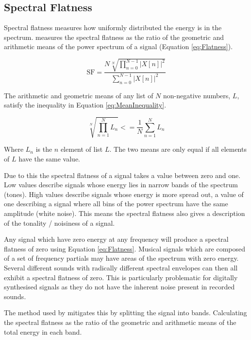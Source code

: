 	\subsection{Spectral Flatness}
	\label{sec:FetureControl-Parameterisation-Flatness}
		Spectral flatness measures how uniformly distributed the energy is in the spectrum.
		\citet{johnston1988transform} measures the spectral flatness as the ratio of the geometric and arithmetic
		means of the power spectrum of a signal (Equation \ref{eq:Flatness}).

		\begin{equation}
			\textrm{SF} = \frac{N\sqrt[N]{\prod_{n = 0}^{N - 1} |X[n]|^{2}}}
			                   {\sum_{n = 0}^{N - 1} |X[n]|^{2}}
			\label{eq:Flatness}
		\end{equation}

		The arithmetic and geometric means of any list of $N$ non-negative numbers, $L$, satisfy the inequality in
		Equation \ref{eq:MeanInequality}.

		\begin{equation}
			\sqrt[N]{\prod_{n = 1}^{N} L_{n}} <= \frac{1}{N} \sum_{n = 1}^{N} L_{n}
			\label{eq:MeanInequality}
		\end{equation}

		Where $L_{n}$ is the $n$ element of list $L$. The two means are only equal if all elements of $L$
		have the same value.

		Due to this the spectral flatness of a signal takes a value between zero and one. Low values describe
		signals whose energy lies in narrow bands of the spectrum (tones). High values describe signals whose
		energy is more spread out, a value of one describing a signal where all bins of the power spectrum have the
		same amplitude (white noise). This means the spectral flatness also gives a description of the tonality /
		noisiness of a signal.

		Any signal which have zero energy at any frequency will produce a spectral flatness of zero using Equation
		\ref{eq:Flatness}. Musical signals which are composed of a set of frequency partials may have areas of the
		spectrum with zero energy. Several different sounds with radically different spectral envelopes can then all
		exhibit a spectral flatness of zero. This is particularly problematic for digitally synthesised signals as
		they do not have the inherent noise present in recorded sounds.

		The method used by \citet{peeters2004a} mitigates this by splitting the signal into bands. Calculating the
		spectral flatness as the ratio of the geometric and arithmetic means of the total energy in each band.

